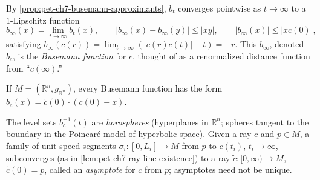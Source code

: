 \begin{definition}
  \label{def:pet-ch7-busemann-function}

  By \cref{prop:pet-ch7-busemann-approximants}, $b_t$ converges pointwise as
  $t\to\infty$ to a $1$-Lipschitz function
  \[
    b_\infty(x)=\lim_{t\to\infty}b_t(x),\qquad |b_\infty(x)-b_\infty(y)|\le|xy|,
    \qquad |b_\infty(x)|\le|xc(0)|,
  \]
  satisfying $b_\infty(c(r))=\lim_{t\to\infty}(|c(r)c(t)|-t)=-r$. This
  $b_\infty$, denoted $b_c$, is the \emph{Busemann function} for $c$, thought
  of as a renormalized distance function from ``$c(\infty)$.''
\end{definition}

\begin{example}
  \label{ex:pet-ch7-euclidean-busemann}

  If $M=(\mathbb{R}^n,g_{\mathbb{R}^n})$, every Busemann function has the form
  $b_c(x)=\dot c(0)\cdot(c(0)-x)$.
\end{example}

\begin{definition}
  \label{def:pet-ch7-horosphere-asymptote}

  The level sets $b_c^{-1}(t)$ are \emph{horospheres} (hyperplanes in $\mathbb{R}^n$;
  spheres tangent to the boundary in the Poincaré model of hyperbolic space).
  Given a ray $c$ and $p\in M$, a family of unit-speed segments
  $\sigma_i:[0,L_i]\to M$ from $p$ to $c(t_i)$, $t_i\to\infty$, subconverges (as
  in \cref{lem:pet-ch7-ray-line-existence}) to a ray $\tilde c:[0,\infty)\to
  M$, $\tilde c(0)=p$, called an \emph{asymptote} for $c$ from $p$; asymptotes
  need not be unique.
\end{definition}

